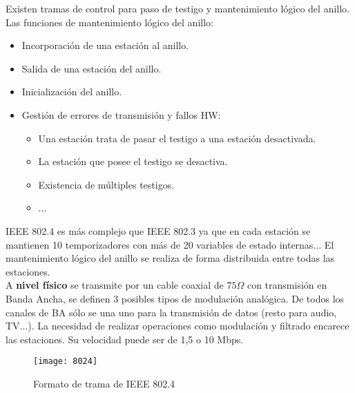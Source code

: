 \documentclass[10pt,portrait, twocolumn]{article}
\begin{document}
Existen tramas de control para paso de testigo y mantenimiento lógico del anillo. Las funciones de mantenimiento lógico del anillo:

	\begin{itemize}
	\item Incorporación de una estación al anillo.
	\item Salida de una estación del anillo.
	\item Inicialización del anillo.
	\item Gestión de errores de transmisión y fallos HW:
	
		\begin{itemize}
		\item Una estación trata de pasar el testigo a una estación desactivada.
		\item La estación que posee el testigo se desactiva.
		\item Existencia de múltiples testigos.
		\item ...
		\end{itemize}
	\end{itemize}
	
IEEE 802.4 es más complejo que IEEE 802.3 ya que en cada estación se mantienen 10 temporizadores con más de 20 variables de estado internas... El mantenimiento lógico del anillo se realiza de forma distribuida entre todas las estaciones.\\

A \textbf{nivel físico} se transmite por un cable coaxial de $75\Omega$ con transmisión en Banda Ancha, se definen 3 posibles tipos de modulación analógica.  De todos los canales de BA sólo se una uno para la transmisión de datos (resto para audio, TV...). La necesidad de realizar operaciones como modulación y filtrado encarece las estaciones. Su velocidad puede ser de 1,5 o 10 Mbps.

\begin{figure}[!ht]	
	\centering
    	\texttt{[image: 8024]}
	\caption{Formato de trama de IEEE 802.4}
\end{figure}  
\end{document}
